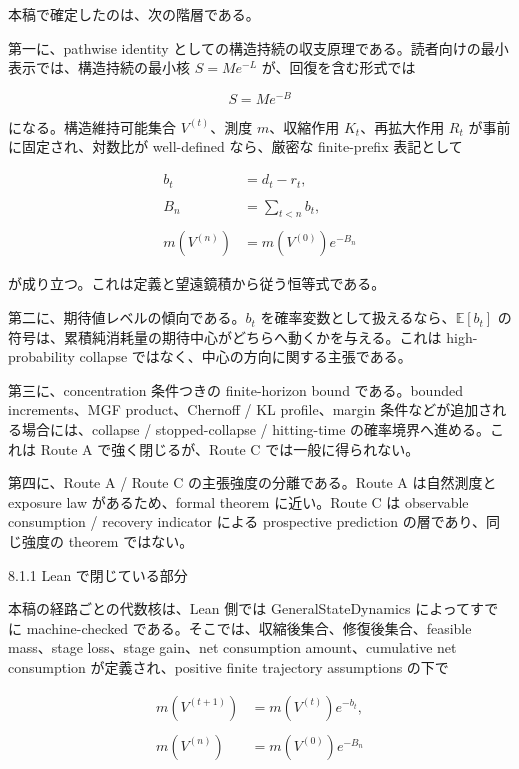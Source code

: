\documentclass[12pt,a4paper]{article}
\begin{document}
本稿で確定したのは、次の階層である。

第一に、pathwise identity としての構造持続の収支原理である。読者向けの最小表示では、構造持続の最小核 \(S=Me^{-L}\) が、回復を含む形式では

\[
S = M e^{-B}
\]

になる。構造維持可能集合 \(V^{(t)}\)、測度 \(m\)、収縮作用 \(K_{t}\)、再拡大作用 \(R_{t}\) が事前に固定され、対数比が well-defined なら、厳密な finite-prefix 表記として

\[
\begin{aligned}
b_{t}&=d_{t}-r_{t}, \\
\qquad \\
B_{n}&=\sum_{t<n}b_{t}, \\
\qquad \\
m(V^{(n)})&=m(V^{(0)})e^{-B_{n}}
\end{aligned}
\]

が成り立つ。これは定義と望遠鏡積から従う恒等式である。

第二に、期待値レベルの傾向である。\(b_{t}\) を確率変数として扱えるなら、\(\mathbb E[b_{t}]\) の符号は、累積純消耗量の期待中心がどちらへ動くかを与える。これは high-probability collapse ではなく、中心の方向に関する主張である。

第三に、concentration 条件つきの finite-horizon bound である。bounded increments、MGF product、Chernoff / KL profile、margin 条件などが追加される場合には、collapse / stopped-collapse / hitting-time の確率境界へ進める。これは Route A で強く閉じるが、Route C では一般に得られない。

第四に、Route A / Route C の主張強度の分離である。Route A は自然測度と exposure law があるため、formal theorem に近い。Route C は observable consumption / recovery indicator による prospective prediction の層であり、同じ強度の theorem ではない。

8.1.1 Lean で閉じている部分

本稿の経路ごとの代数核は、Lean 側では GeneralStateDynamics によってすでに machine-checked である。そこでは、収縮後集合、修復後集合、feasible mass、stage loss、stage gain、net consumption amount、cumulative net consumption が定義され、positive finite trajectory assumptions の下で

\[
\begin{aligned}
m(V^{(t+1)})&=m(V^{(t)})e^{-b_{t}}, \\
\qquad \\
m(V^{(n)})&=m(V^{(0)})e^{-B_{n}}
\end{aligned}
\]
\end{document}
